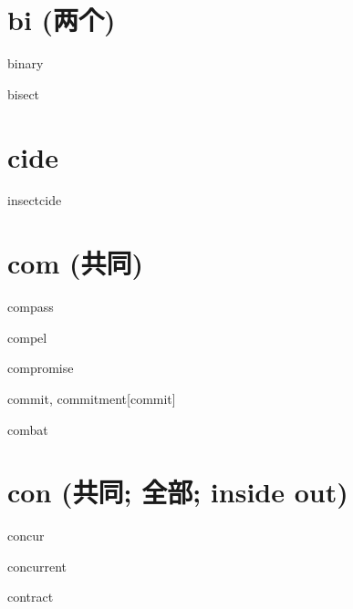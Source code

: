 \section{bi (两个)}

\begin{RefWord}{binary}
\end{RefWord}

\begin{RefWord}{bisect}
\end{RefWord}

\section{cide}

\begin{RefWord}{insectcide}
\end{RefWord}

\section{com (共同)}

\begin{RefWord}{compass}
\end{RefWord}

\begin{RefWord}{compel}
\end{RefWord}

\begin{RefWord}{compromise}
\end{RefWord}

\begin{RefWord}{commit, commitment}[commit]
\end{RefWord}

\begin{RefWord}{combat}
\end{RefWord}

\section{con (共同; 全部; inside out)}
\begin{RefWord}{concur}
\end{RefWord}

\begin{RefWord}{concurrent}
\end{RefWord}

\begin{RefWord}{contract}
\end{RefWord}

